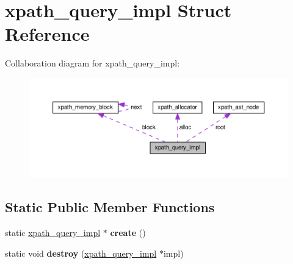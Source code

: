 \hypertarget{structxpath__query__impl}{\section{xpath\+\_\+query\+\_\+impl Struct Reference}
\label{structxpath__query__impl}
}


Collaboration diagram for xpath\+\_\+query\+\_\+impl\+:
\nopagebreak
\begin{figure}[H]
\begin{center}
\leavevmode
\includegraphics[width=350pt]{structxpath__query__impl__coll__graph}
\end{center}
\end{figure}
\subsection*{Static Public Member Functions}
\begin{DoxyCompactItemize}
\item 
\hypertarget{structxpath__query__impl_afcf45bb9a20a4117b1e963d83277aa7f}{static \hyperlink{structxpath__query__impl}{xpath\+\_\+query\+\_\+impl} $\ast$ {\bfseries create} ()}\label{structxpath__query__impl_afcf45bb9a20a4117b1e963d83277aa7f}

\item 
\hypertarget{structxpath__query__impl_a7233d3b89ed2f20f76b85de918e963fa}{static void {\bfseries destroy} (\hyperlink{structxpath__query__impl}{xpath\+\_\+query\+\_\+impl} $\ast$impl)}\label{structxpath__query__impl_a7233d3b89ed2f20f76b85de918e963fa}

\end{DoxyCompactItemize}
